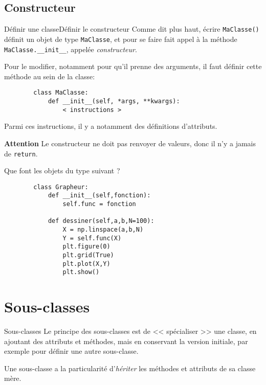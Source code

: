 \subsection{Constructeur}

\begin{frame}[fragile]{Définir une classe}{Définir le constructeur}
	Comme dit plus haut, écrire \lstinline|MaClasse()| définit un objet de type \lstinline|MaClasse|, et pour se faire fait appel à la méthode \lstinline|MaClasse.__init__|, appelée \textit{constructeur}.\pause
	
	Pour le modifier, notamment pour qu'il prenne des arguments, il faut définir cette méthode au sein de la classe:
	\begin{lstlisting}
		class MaClasse:
			def __init__(self, *args, **kwargs):
				< instructions >
	\end{lstlisting} Parmi ces instructions, il y a notamment des définitions d'attributs.\pause
	
	\textbf{Attention} Le constructeur ne doit pas renvoyer de valeurs, donc il n'y a jamais de \lstinline|return|.
\end{frame}

\begin{frame}[fragile]
	\begin{exem}
	Que font les objets du type suivant ?
	\begin{lstlisting}
		class Grapheur:
			def __init__(self,fonction):
				self.func = fonction
			
			def dessiner(self,a,b,N=100):
				X = np.linspace(a,b,N)
				Y = self.func(X)
				plt.figure(0)
				plt.grid(True)
				plt.plot(X,Y)
				plt.show()
	\end{lstlisting}
	\end{exem}
\end{frame}


\section{Sous-classes}

\begin{frame}[fragile]{Sous-classes}
	Le principe des sous-classes est de << spécialiser >> une classe, en ajoutant des attributs et méthodes, mais en conservant la version initiale, par exemple pour définir une autre sous-classe.\pause
	
	Une sous-classe a la particularité d'\textit{hériter} les méthodes et attributs de sa classe mère.\pause
\end{frame}

